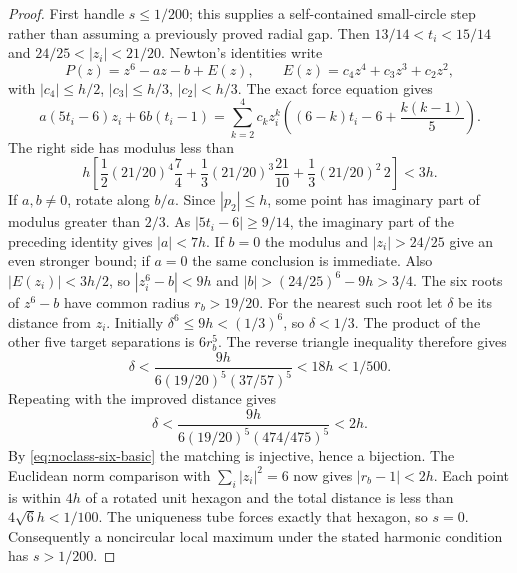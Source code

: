 \documentclass[11pt]{article}
\theoremstyle{remark}
\numberwithin{equation}{section}
\begin{document}
\begin{proof}
First handle $s\le1/200$; this supplies a self-contained small-circle
step rather than assuming a previously proved radial gap.
Then $13/14<t_i<15/14$ and $24/25<|z_i|<21/20$.
Newton's identities write
\[
 P(z)=z^6-a z-b+E(z),\qquad
 E(z)=c_4z^4+c_3z^3+c_2z^2,
\]
with $|c_4|\le h/2$, $|c_3|\le h/3$, $|c_2|<h/3$.
The exact force equation gives
\[
 a(5t_i-6)z_i+6b(t_i-1)
 =\sum_{k=2}^4c_kz_i^k
                \left((6-k)t_i-6+\frac{k(k-1)}5\right).
\]
The right side has modulus less than
\[
 h\left[\frac12(21/20)^4\frac74
       +\frac13(21/20)^3\frac{21}{10}
       +\frac13(21/20)^2\,2\right]<3h.
\]
If $a,b\ne0$, rotate along $b/a$. Since $|p_2|\le h$, some point
has imaginary part of modulus greater than $2/3$.
As $|5t_i-6|\ge9/14$, the imaginary part of the preceding identity
gives $|a|<7h$. If $b=0$ the modulus and $|z_i|>24/25$ give an
even stronger bound; if $a=0$ the same conclusion is immediate.
Also $|E(z_i)|<3h/2$, so $|z_i^6-b|<9h$ and
$|b|>(24/25)^6-9h>3/4$.
The six roots of $z^6-b$ have common radius $r_b>19/20$.
For the nearest such root let $\delta$ be its distance from $z_i$.
Initially $\delta^6\le9h<(1/3)^6$, so $\delta<1/3$.
The product of the other five target separations is $6r_b^5$.
The reverse triangle inequality therefore gives
\[
 \delta<
 \frac{9h}{6(19/20)^5(37/57)^5}<18h<1/500.
\]
Repeating with the improved distance gives
\[
 \delta<\frac{9h}{6(19/20)^5(474/475)^5}<2h.
\]
By \eqref{eq:noclass-six-basic} the matching is injective, hence
a bijection. The Euclidean norm comparison with $\sum_i|z_i|^2=6$
now gives $|r_b-1|<2h$. Each point is within $4h$ of a rotated
unit hexagon and the total distance is less than $4\sqrt6h<1/100$.
The uniqueness tube forces exactly that hexagon, so $s=0$.
Consequently a noncircular local maximum under the stated harmonic
condition has $s>1/200$.


\end{proof}
\end{document}
